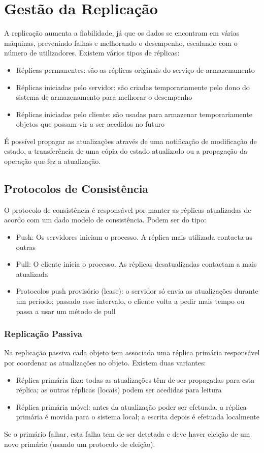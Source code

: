 \documentclass[10pt,a4paper]{report}
\begin{document}
\section{Gestão da Replicação}
A replicação aumenta a fiabilidade, já que os dados se encontram em várias máquinas, prevenindo falhas e melhorando o desempenho, escalando com o número de utilizadores. Existem vários tipos de réplicas:
\begin{itemize}
\item Réplicas permanentes: são as réplicas originais do serviço de armazenamento
\item Réplicas iniciadas pelo servidor: são criadas temporariamente pelo dono do sistema de armazenamento para melhorar o desempenho
\item Réplicas iniciadas pelo cliente: são usadas para armazenar temporariamente objetos que possam vir a ser acedidos no futuro
\end{itemize}
É possível propagar as atualizações através de uma notificação de modificação de estado, a transferência de uma cópia do estado atualizado ou a propagação da operação que fez a atualização.
\subsection{Protocolos de Consistência}
O protocolo de consistência é responsável por manter as réplicas atualizadas de acordo com um dado modelo de consistência. Podem ser do tipo:
\begin{itemize}
\item Push: Os servidores iniciam o processo. A réplica mais utilizada contacta as outras
\item Pull: O cliente inicia o processo. As réplicas desatualizadas contactam a mais atualizada
\item Protocolos push provisório (lease): o servidor só envia as atualizações durante um período; passado esse intervalo, o cliente volta a pedir mais tempo ou passa a usar um método de pull
\end{itemize}
\subsubsection{Replicação Passiva}
Na replicação passiva cada objeto tem associada uma réplica primária responsável por coordenar as atualizações no objeto. Existem duas variantes:
\begin{itemize}
\item  Réplica primária fixa: todas as atualizações têm de ser propagadas para esta réplica; as outras réplicas (locais) podem ser acedidas para leitura
\item Réplica primária móvel: antes da atualização poder ser efetuada, a réplica primária é movida para o sistema local; a escrita depois é efetuada localmente
\end{itemize}
Se o primário falhar, esta falha tem de ser detetada e deve haver eleição de um novo primário (usando um protocolo de eleição).
\end{document}
